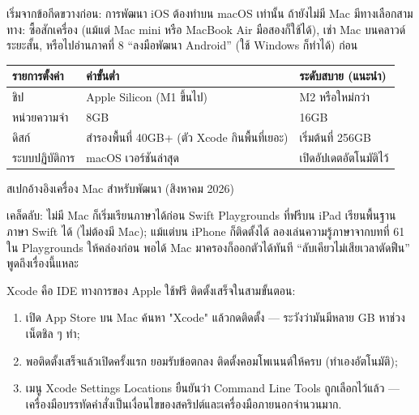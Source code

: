 


เริ่มจากข้อกีดขวางก่อน: การพัฒนา iOS ต้องทำบน macOS เท่านั้น ถ้ายังไม่มี Mac มีทางเลือกสามทาง: ซื้อสักเครื่อง (แม้แต่ Mac mini หรือ MacBook Air มือสองก็ใช้ได้), เช่า Mac บนคลาวด์ระยะสั้น, หรือไปอ่านภาคที่ 8 “ลงมือพัฒนา Android” (ใช้ Windows ก็ทำได้) ก่อน

\begin{center}
\begin{tabularx}{\linewidth}{|X|X|X|}
\hline
\textbf{รายการตั้งค่า} & \textbf{ค่าขั้นต่ำ} & \textbf{ระดับสบาย (แนะนำ)} \tabularnewline
\hline
ชิป & Apple Silicon (M1 ขึ้นไป) & M2 หรือใหม่กว่า \tabularnewline
หน่วยความจำ & 8GB & 16GB \tabularnewline
ดิสก์ & สำรองพื้นที่ 40GB+ (ตัว Xcode กินพื้นที่เยอะ) & เริ่มต้นที่ 256GB \tabularnewline
ระบบปฏิบัติการ & macOS เวอร์ชันล่าสุด & เปิดอัปเดตอัตโนมัติไว้ \tabularnewline
\hline
\end{tabularx}
\end{center}

\begin{center}\small\color{gray}สเปกอ้างอิงเครื่อง Mac สำหรับพัฒนา (สิงหาคม 2026)\end{center}

\begin{tcbinfo}{เคล็ดลับ: ไม่มี Mac ก็เริ่มเรียนภาษาได้ก่อน}
Swift Playgrounds ที่ฟรีบน iPad เรียนพื้นฐานภาษา Swift ได้ (ไม่ต้องมี Mac); แม้แต่บน iPhone ก็ติดตั้งได้ ลองเล่นความรู้ภาษาจากบทที่ 61 ใน Playgrounds ให้คล่องก่อน พอได้ Mac มาครองก็ออกตัวได้ทันที “ลับเคียวไม่เสียเวลาตัดฟืน” พูดถึงเรื่องนี้แหละ

\end{tcbinfo}


Xcode คือ IDE ทางการของ Apple ใช้ฟรี ติดตั้งเสร็จในสามขั้นตอน:

\begin{enumerate}
  \item เปิด App Store บน Mac ค้นหา "Xcode" แล้วกดติดตั้ง — ระวังว่ามันมีหลาย GB หาช่วงเน็ตชิล ๆ ทำ;
  \item พอติดตั้งเสร็จแล้วเปิดครั้งแรก ยอมรับข้อตกลง ติดตั้งคอมโพเนนต์ให้ครบ (ทำเองอัตโนมัติ);
  \item เมนู Xcode Settings Locations ยืนยันว่า Command Line Tools ถูกเลือกไว้แล้ว — เครื่องมือบรรทัดคำสั่งเป็นเงื่อนไขของสคริปต์และเครื่องมือภายนอกจำนวนมาก.
\end{enumerate}

